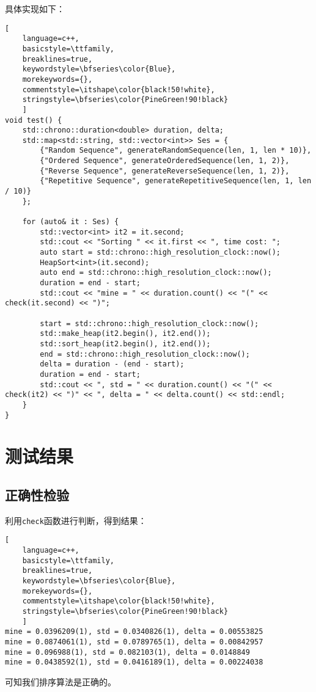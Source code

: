 \documentclass[UTF8]{ctexart}
\begin{document}
具体实现如下：
\begin{lstlisting}[ 
    language=c++,
    basicstyle=\ttfamily,
    breaklines=true,
    keywordstyle=\bfseries\color{Blue}, 
    morekeywords={}, 
    commentstyle=\itshape\color{black!50!white},
    stringstyle=\bfseries\color{PineGreen!90!black} 
    ]
void test() {
    std::chrono::duration<double> duration, delta;
    std::map<std::string, std::vector<int>> Ses = {
        {"Random Sequence", generateRandomSequence(len, 1, len * 10)},
        {"Ordered Sequence", generateOrderedSequence(len, 1, 2)},
        {"Reverse Sequence", generateReverseSequence(len, 1, 2)},
        {"Repetitive Sequence", generateRepetitiveSequence(len, 1, len / 10)}
    };

    for (auto& it : Ses) {
        std::vector<int> it2 = it.second;
        std::cout << "Sorting " << it.first << ", time cost: ";
        auto start = std::chrono::high_resolution_clock::now();
        HeapSort<int>(it.second);
        auto end = std::chrono::high_resolution_clock::now();
        duration = end - start;
        std::cout << "mine = " << duration.count() << "(" << check(it.second) << ")";
        
        start = std::chrono::high_resolution_clock::now();
        std::make_heap(it2.begin(), it2.end());
        std::sort_heap(it2.begin(), it2.end());
        end = std::chrono::high_resolution_clock::now();
        delta = duration - (end - start);
        duration = end - start;
        std::cout << ", std = " << duration.count() << "(" << check(it2) << ")" << ", delta = " << delta.count() << std::endl;
    }
}
\end{lstlisting}
\section{测试结果}
\subsection{正确性检验}
利用\texttt{check}函数进行判断，得到结果：
\begin{lstlisting}[ 
    language=c++,
    basicstyle=\ttfamily,
    breaklines=true,
    keywordstyle=\bfseries\color{Blue}, 
    morekeywords={}, 
    commentstyle=\itshape\color{black!50!white},
    stringstyle=\bfseries\color{PineGreen!90!black} 
    ]
mine = 0.0396209(1), std = 0.0340826(1), delta = 0.00553825
mine = 0.0874061(1), std = 0.0789765(1), delta = 0.00842957
mine = 0.096988(1), std = 0.082103(1), delta = 0.0148849
mine = 0.0438592(1), std = 0.0416189(1), delta = 0.00224038
\end{lstlisting}
可知我们排序算法是正确的。
\end{document}
